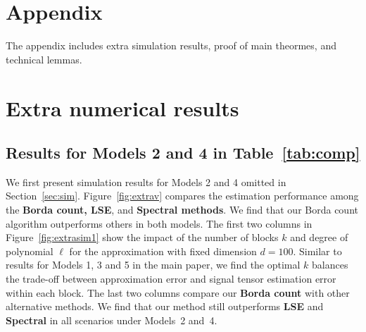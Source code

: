 \documentclass[11pt]{article}
\theoremstyle{definition}
\begin{document}




\clearpage
\appendix
\section*{Appendix}
The appendix includes extra simulation results, proof of main theormes, and technical lemmas. 




\renewcommand{\thefigure}{S\arabic{figure}}
\setcounter{figure}{0}   
\renewcommand{\thetable}{S\arabic{table}}
\setcounter{table}{0}   

\section{Extra numerical results}
\subsection{Results for Models 2 and 4 in Table~\ref{tab:comp}}\label{sec:extra}
We first present simulation results for Models 2 and 4 omitted in Section~\ref{sec:sim}. Figure~\ref{fig:extrav} compares the estimation performance among the {\bf \small Borda count, LSE}, and {\bf \small Spectral methods}. We find that our Borda count algorithm outperforms others in both models. The first two columns in Figure~\ref{fig:extrasim1} show the impact of the number of blocks $k$ and degree of polynomial $\ell$ for the approximation with fixed dimension $d = 100$. Similar to results for Models 1, 3 and 5 in the main paper, we find the optimal $k$ balances the trade-off between approximation error and signal tensor estimation error within each block. The last two columns compare our {\bf \small Borda count} with other alternative methods. We find that our method still outperforms {\bf \small LSE} and {\bf \small Spectral} in all scenarios under Models~2 and~4.
\end{document}
